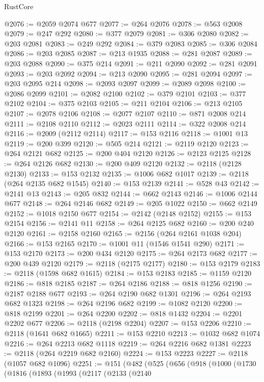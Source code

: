 \begin{lexlean}{RustCore}
\begin{coremodule}
@2076 := @2059 @2074 @677
@2077 := @264 @2076
@2078 := @563 @2008
@2079 := @247 @292
@2080 := @377 @2079
@2081 := @306 @2080
@2082 := @203 @2081
@2083 := @249 @292
@2084 := @379 @2083
@2085 := @306 @2084
@2086 := @203 @2085
@2087 := @213 @1935
@2088 := @281 @2087
@2089 := @203 @2088
@2090 := @375 @214
@2091 := @211 @2090
@2092 := @281 @2091
@2093 := @203 @2092
@2094 := @213 @2090
@2095 := @281 @2094
@2097 := @203 @2095 @214
@2098 := @2093 @2097
@2099 := @2089 @2098
@2100 := @2086 @2099
@2101 := @2082 @2100
@2102 := @379 @2101
@2103 := @377 @2102
@2104 := @375 @2103
@2105 := @211 @2104
@2106 := @213 @2105
@2107 := @2078 @2106
@2108 := @2077 @2107
@2110 := @871 @2008 @214
@2111 := @2108 @2110
@2112 := @2023 @2111
@2114 := @322 @2008 @214
@2116 := @2009 (@2112 @2114)
@2117 := @153 @2116
@2118 := @1001 @13
@2119 := @200 @399
@2120 := @505 @214
@2121 := @2119 @2120
@2123 := @264 @2121 @682
@2125 := @200 @404 @2120
@2126 := @2123 @2125
@2128 := @264 @2126 @682
@2130 := @200 @409 @2120
@2132 := @2118 (@2128 @2130)
@2133 := @153 @2132
@2135 := @1006 @682 @1017
@2139 := @2118 (@264 @2135 @682 @1545)
@2140 := @153 @2139
@2141 := @528 @43
@2142 := @2141 @13
@2143 := @205 @832
@2144 := @662 @2143
@2146 := @1006 @2144 @677
@2148 := @264 @2146 @682
@2149 := @205 @1022
@2150 := @662 @2149
@2152 := @1018 @2150 @677
@2154 := @2142 (@2148 @2152)
@2155 := @153 @2154
@2156 := @2141 @11
@2158 := @264 @2125 @682
@2160 := @200 @240 @2120
@2161 := @2158 @2160
@2165 := @2156 (@264 @2161 @1038 @204)
@2166 := @153 @2165
@2170 := @1001 @11 (@1546 @1541 @290)
@2171 := @153 @2170
@2173 := @200 @434 @2120
@2175 := @264 @2173 @682
@2177 := @200 @439 @2120
@2179 := @2118 (@2175 @2177)
@2180 := @153 @2179
@2183 := @2118 (@1598 @682 @1615)
@2184 := @153 @2183
@2185 := @1159 @2120
@2186 := @818 @2185
@2187 := @264 @2186
@2188 := @818 @1256
@2190 := @2187 @2188 @677
@2193 := @264 @2190 @682 @1301
@2196 := @264 @2193 @682 @1323
@2198 := @264 @2196 @682
@2199 := @1082 @2120
@2200 := @818 @2199
@2201 := @264 @2200
@2202 := @818 @1432
@2204 := @2201 @2202 @677
@2206 := @2118 (@2198 @2204)
@2207 := @153 @2206
@2210 := @2118 (@1641 @682 @1665)
@2211 := @153 @2210
@2213 := @1032 @682 @1074
@2216 := @264 @2213 @682 @1118
@2219 := @264 @2216 @682 @1381
@2223 := @2118 (@264 @2219 @682 @2160)
@2224 := @153 @2223
@2227 := @2118 (@1057 @682 @1096)
@2251 := @151
    (@482
      (@525
        (@656
          (@918
            (@1000
              (@1730
                (@1816
                  (@1893
                    (@1993
                      (@2117
                        (@2133
                          (@2140

\end{coremodule}
\end{lexlean}
